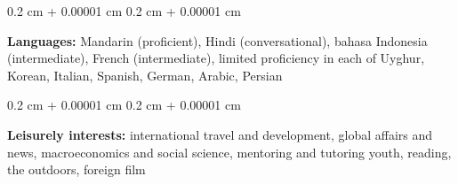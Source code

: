 \documentclass[10pt, letterpaper]{article}
\newenvironment{onecolentry}{
    \begin{adjustwidth}{
        0.2 cm + 0.00001 cm
    }{
        0.2 cm + 0.00001 cm
    }
}{
    \end{adjustwidth}
} %
\begin{document}
        \begin{onecolentry}
            \textbf{Languages:} Mandarin (proficient), Hindi (conversational), bahasa Indonesia (intermediate), French (intermediate), limited proficiency in each of Uyghur, Korean, Italian, Spanish, German, Arabic, Persian
        \end{onecolentry}

        \vspace{0.2 cm}

        \begin{onecolentry}
            \textbf{Leisurely interests:} international travel and development, global affairs and news, macroeconomics and social science, mentoring and tutoring youth, reading, the outdoors, foreign film
        \end{onecolentry} 
\end{document}
